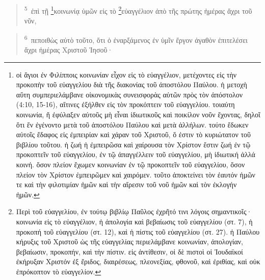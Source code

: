 \documentclass{article}
\newcommand{\currentverse}{1} %
\newcommand{\setcurrentverse}[1]{\renewcommand{\currentverse}{#1}}
\begin{document}
\begin{verse}

\setcurrentverse{5}

\setcounter{footnote}{0}

\textsuperscript{5}~ἐπὶ τῇ \footnote{
    οἱ ἅγιοι ἐν Φιλίπποις κοινωνίαν εἶχον εἰς τὸ εὐαγγέλιον, μετέχοντες εἰς τὴν προκοπὴν τοῦ εὐαγγελίου διὰ τῆς διακονίας τοῦ ἀποστόλου Παύλου. ἡ μετοχὴ αὕτη συμπεριελάμβανε οἰκονομικὰς συνεισφορὰς αὐτῶν πρὸς τὸν ἀπόστολον (4:10, 15-16), αἵτινες ἐξήλθεν εἰς τὸν προκόπτειν τοῦ εὐαγγελίου. τοιαύτη κοινωνία, ἥ ἐφύλαξεν αὐτοῦς μὴ εἶναι ἰδιωτικοῦς καὶ ποικίλον νοῦν ἔχοντας, δηλοῖ ὅτι ἕν ἐγένοντο μετὰ τοῦ ἀποστόλου Παύλου καὶ μετὰ ἀλλήλων. τούτο ἔδωκεν αὐτοῖς ἔδαφος εἰς ἐμπειρίαν καὶ χάραν τοῦ Χριστοῦ, ὅ ἐστιν τὸ κυριώτατον τοῦ βιβλίου τοῦτου. ἡ ζωή ἡ ἐμπειρῶσα καὶ χαίρουσα τὸν Χρίστον ἔστιν ζωή ἐν τῷ προκοπτεῖν τοῦ εὐαγγελίου, ἐν τῷ ἀπαγγέλλειν τοῦ εὐαγγελίου, μὴ ἰδιωτική ἀλλά κοινή. ὅσον πλείον ἔχωμεν κοινωνίαν ἐν τῷ προκοπτεῖν τοῦ εὐαγγελίου, ὅσον πλείον τὸν Χρίστον ἐμπειρῶμεν καὶ χαιρόμεν. τοῦτο ἀποκτείνει τὸν ἐαυτόν ἡμῶν τε καὶ τὴν φιλοτιμίαν ἡμῶν καὶ τὴν αἵρεσιν τοῦ νοῦ ἡμῶν καὶ τὸν ἐκλογήν ἡμῶν.
    }κοινωνίᾳ ὑμῶν εἰς τὸ \footnote{
Περὶ τοῦ εὐαγγελίου, ἐν τούτῳ βιβλίῳ Παῦλος ἐχρῆτό τινι λόγοις σημαντικοῖς· κοινωνία εἰς τὸ εὐαγγέλιον, ἡ ἀπολογία καὶ βεβαίωσις τοῦ εὐαγγελίου (στ. 7), ἡ προκοπή τοῦ εὐαγγελίου (στ. 12), καὶ ἡ πίστις τοῦ εὐαγγελίου (στ. 27). ἠ Παύλου κήρυξις τοῦ Χριστοῦ ὡς τῆς εὐαγγελίας περιελάμβανε κοινωνίαν, ἀπολογίαν, βεβαίωσιν, προκοπήν, καὶ τὴν πίστιν. εἰς ἀντίθεσιν, οἱ δὲ πιστοὶ οἱ Ἰουδαϊκοί ἐκήρυξαν Χριστόν ἐξ ἔριδος, διαιρέσεως, πλεονεξίας, φθονοῦ, καὶ ἐριθίας, καὶ οὐκ ἐπρόκοπτον τὸ εὐαγγελίον.
    }εὐαγγέλιον ἀπὸ τῆς πρώτης ἡμέρας ἄχρι τοῦ νῦν,

\end{verse}

\begin{verse}

\setcurrentverse{6}

\setcounter{footnote}{0}

\textsuperscript{6}~πεποιθὼς αὐτὸ τοῦτο, ὅτι ὁ ἐναρξάμενος ἐν ὑμῖν ἔργον ἀγαθὸν ἐπιτελέσει ἄχρι ἡμέρας Χριστοῦ Ἰησοῦ·

\end{verse}
\end{document}
